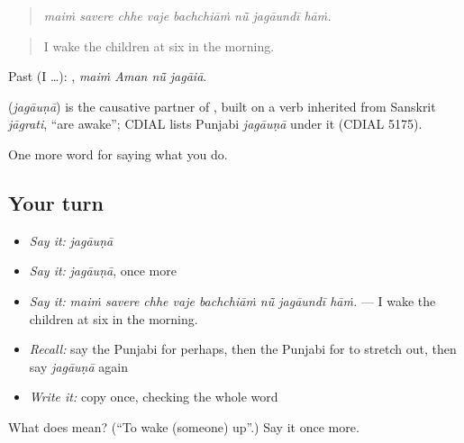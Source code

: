 \begin{quote}
       
\end{quote}

\begin{quote}
\emph{maiṁ savere chhe vaje bachchiāṁ nū̃ jagāundī hāṁ.}
\end{quote}

\begin{quote}
I wake the children at six in the morning.
\end{quote}

Past (I …):    , \emph{maiṁ Aman nū̃ jagāiā}.

\begin{cousinweb}
\textbf{} (\emph{jagāuṇā}) is the causative partner of , built on a verb inherited from Sanskrit \emph{jāgrati}, \textquotedblleft{}are awake\textquotedblright{}; CDIAL lists Punjabi \emph{jagāuṇā} under it (CDIAL 5175).
\end{cousinweb}

\begin{grammarlens}[title={What you've built}]
One more word for saying what you do.
\end{grammarlens}

\subsection*{Your turn}
\begin{itemize}
\raggedright
  \item \emph{Say it:} \emph{jagāuṇā}
  \item \emph{Say it:} \emph{jagāuṇā}, once more
  \item \emph{Say it:} \emph{maiṁ savere chhe vaje bachchiāṁ nū̃ jagāundī hāṁ.} — I wake the children at six in the morning.
  \item \emph{Recall:} say the Punjabi for perhaps, then the Punjabi for to stretch out, then say \emph{jagāuṇā} again
  \item \emph{Write it:} copy \textbf{} once, checking the whole word
\end{itemize}

\begin{tcolorbox}[breakable,colback=teal!4,colframe=teal!35!black,title={Before you move on}]
What does  mean? (\textquotedblleft{}To wake (someone) up\textquotedblright{}.) Say it once more.
\end{tcolorbox}
